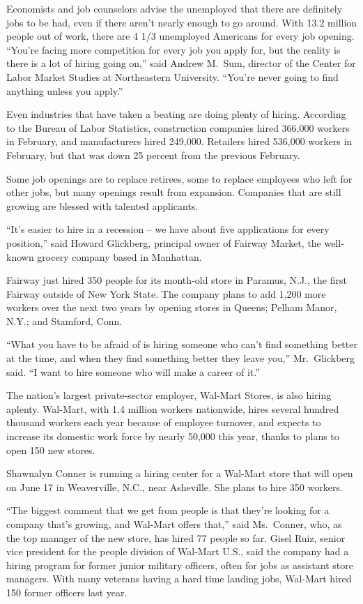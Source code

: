 \documentclass[12pt,a4paper,onecolumn]{article}
\begin{document}
Economists and job counselors advise the unemployed that there are definitely jobs to be had, even
if there aren't nearly enough to go around. With 13.2 million people out of work, there are 4 1/3
unemployed Americans for every job opening. ``You're facing more competition for every job you apply
for, but the reality is there is a lot of hiring going on,'' said Andrew M.~Sum, director of the
Center for Labor Market Studies at Northeastern University. ``You're never going to find anything
unless you apply.''

Even industries that have taken a beating are doing plenty of hiring. According to the Bureau of
Labor Statistics, construction companies hired 366,000 workers in February, and manufacturers hired
249,000. Retailers hired 536,000 workers in February, but that was down 25 percent from the previous
February.

Some job openings are to replace retirees, some to replace employees who left for other jobs, but
many openings result from expansion. Companies that are still growing are blessed with talented
applicants.

``It's easier to hire in a recession -- we have about five applications for every position,'' said
Howard Glickberg, principal owner of Fairway Market, the well-known grocery company based in
Manhattan.

Fairway just hired 350 people for its month-old store in Paramus, N.J., the first Fairway outside of
New York State. The company plans to add 1,200 more workers over the next two years by opening
stores in Queens; Pelham Manor, N.Y.; and Stamford, Conn.

``What you have to be afraid of is hiring someone who can't find something better at the time, and
when they find something better they leave you,'' Mr.~Glickberg said. ``I want to hire someone who
will make a career of it.''

The nation's largest private-sector employer, Wal-Mart Stores, is also hiring aplenty. Wal-Mart,
with 1.4 million workers nationwide, hires several hundred thousand workers each year because of
employee turnover, and expects to increase its domestic work force by nearly 50,000 this year,
thanks to plans to open 150 new stores.

Shawnalyn Conner is running a hiring center for a Wal-Mart store that will open on June 17 in
Weaverville, N.C., near Asheville. She plans to hire 350 workers.

``The biggest comment that we get from people is that they're looking for a company that's growing,
and Wal-Mart offers that,'' said Ms.~Conner, who, as the top manager of the new store, has hired 77
people so far. Gisel Ruiz, senior vice president for the people division of Wal-Mart U.S., said the
company had a hiring program for former junior military officers, often for jobs as assistant store
managers. With many veterans having a hard time landing jobs, Wal-Mart hired 150 former officers
last year.
\end{document}
